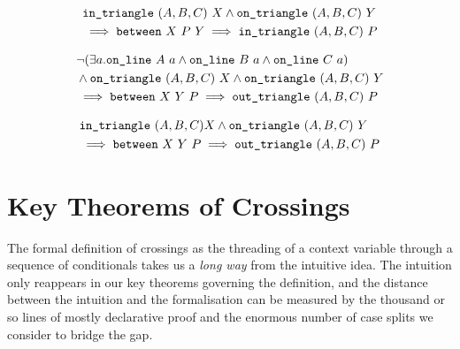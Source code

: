 \begin{equation}\label{eq:inTriangle2}
  \begin{split}
    &\texttt{in\_triangle}\ (A,B,C)\ X \wedge \texttt{on\_triangle}\ (A,B,C)\ Y\\
    &\implies \texttt{between}\ X\ P\ Y \implies \texttt{in\_triangle}\ (A,B,C)\ P
  \end{split}
\end{equation}

\begin{equation}\label{eq:outTriangle1}
  \begin{split}
    &\neg(\exists a.\texttt{on\_line}\ A\ a\wedge \texttt{on\_line}\ B\ a\wedge \texttt{on\_line}\ C\ a)\\
    &\wedge \texttt{on\_triangle}\ (A,B,C)\ X \wedge \texttt{on\_triangle}\ (A,B,C)\ Y\\
    &\implies \texttt{between}\ X\ Y\ P \implies \texttt{out\_triangle}\ (A,B,C)\ P
  \end{split}
\end{equation}

\begin{equation}\label{eq:outTriangle2}
  \begin{split}
    &\texttt{in\_triangle}\ (A,B,C) X \wedge \texttt{on\_triangle}\ (A,B,C)\ Y\\
    &\implies \texttt{between}\ X\ Y\ P \implies \texttt{out\_triangle}\ (A,B,C)\ P
  \end{split}
\end{equation}

\section{Key Theorems of Crossings}\label{sec:CrossingVerification}
The formal definition of crossings as the threading of a context variable through a sequence of conditionals takes us a \emph{long way} from the intuitive idea. The intuition only reappears in our key theorems governing the definition, and the distance between the intuition and the formalisation can be measured by the thousand or so lines of mostly declarative proof and the enormous number of case splits we consider to bridge the gap.

